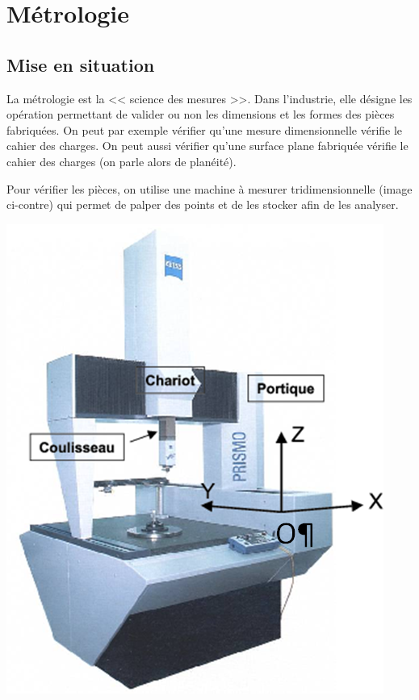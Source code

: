 \else
\fi

\section{Métrologie}
\subsection{Mise en situation}
\ifprof
\else

\noindent\begin{minipage}[c]{.75\linewidth}
La métrologie est la << science des mesures >>. Dans l'industrie, elle désigne les opération permettant de valider ou non les dimensions et les formes des pièces fabriquées. On peut par exemple vérifier qu'une mesure dimensionnelle vérifie le cahier des charges. On peut aussi vérifier qu'une surface plane fabriquée vérifie le cahier des charges (on parle alors de planéité).

Pour vérifier les pièces, on utilise une machine à mesurer tridimensionnelle (image ci-contre) qui permet de palper des points et de les stocker afin de les analyser.

\end{minipage} \hfill
\begin{minipage}[c]{.2\linewidth}
\begin{center}
\includegraphics[width=.95\textwidth]{images/MMT}
\end{center}
\end{minipage}

